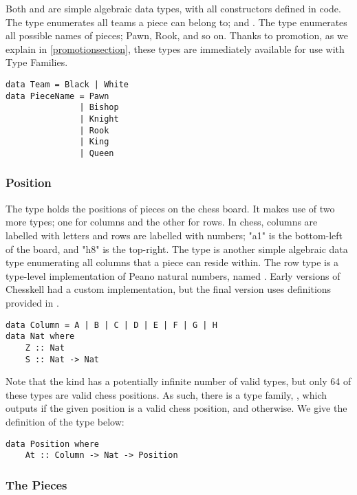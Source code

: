 Both  and  are simple algebraic data types, with all constructors defined in code. The  type enumerates all teams a piece can belong to;  and . The  type enumerates all possible names of pieces; Pawn, Rook, and so on. Thanks to promotion, as we explain in \cref{promotionsection}, these types are immediately available for use with Type Families.

\begin{lstlisting}
data Team = Black | White
data PieceName = Pawn
               | Bishop
               | Knight
               | Rook
               | King
               | Queen
\end{lstlisting}

\subsubsection{Position}

The  type holds the positions of pieces on the chess board. It makes use of two more types; one for columns and the other for rows. In chess, columns are labelled with letters and rows are labelled with numbers; "a1" is the bottom-left of the board, and "h8" is the top-right. The  type is another simple algebraic data type enumerating all columns that a piece can reside within. The row type is a type-level implementation of Peano natural numbers, named . Early versions of Chesskell had a custom implementation, but the final version uses definitions provided in .

\begin{lstlisting}
data Column = A | B | C | D | E | F | G | H
data Nat where
    Z :: Nat
    S :: Nat -> Nat
\end{lstlisting}

Note that the  kind has a potentially infinite number of valid types, but only 64 of these types are valid chess positions. As such, there is a type family, , which outputs  if the given position is a valid chess position, and  otherwise. We give the definition of the  type below:

\begin{lstlisting}
data Position where
    At :: Column -> Nat -> Position
\end{lstlisting}

\subsubsection{The Pieces}

